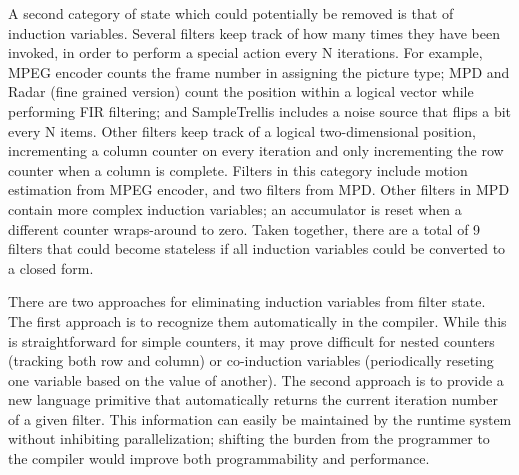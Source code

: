 A second category of state which could potentially be removed is that
of induction variables.  Several filters keep track of how many times
they have been invoked, in order to perform a special action every N
iterations.  For example, MPEG encoder counts the frame number in
assigning the picture type; MPD and Radar (fine grained version) count
the position within a logical vector while performing FIR filtering;
and SampleTrellis includes a noise source that flips a bit every N
items.  Other filters keep track of a logical two-dimensional
position, incrementing a column counter on every iteration and only
incrementing the row counter when a column is complete.  Filters in
this category include motion estimation from MPEG encoder, and two
filters from MPD.  Other filters in MPD contain more complex induction
variables; an accumulator is reset when a different counter
wraps-around to zero.  Taken together, there are a total of 9 filters
that could become stateless if all induction variables could be
converted to a closed form.

There are two approaches for eliminating induction variables from
filter state.  The first approach is to recognize them automatically
in the compiler.  While this is straightforward for simple counters,
it may prove difficult for nested counters (tracking both row and
column) or co-induction variables (periodically reseting one variable
based on the value of another).  The second approach is to provide a
new language primitive that automatically returns the current
iteration number of a given filter.  This information can easily be
maintained by the runtime system without inhibiting parallelization;
shifting the burden from the programmer to the compiler would improve
both programmability and performance.

